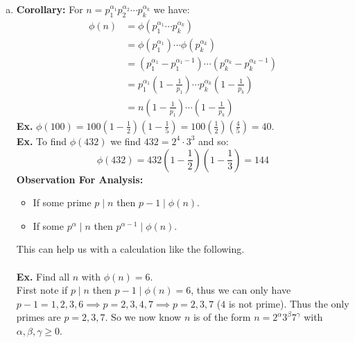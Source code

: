 \documentclass[class=article, crop=false]{standalone}
\begin{document}
\begin{enumerate}
\begin{enumerate}[(a)]
\begin{proof}
		Each is a row $r$ with $\gcd(r,m)=1$. Observe that $\{0,1,2,\cdots,n-1\}$ is a 
		CSOR mod $n$ and since $\gcd(m,n)=1$, so is the set 
		$\{0\cdot m+r, 1\cdot m+r, \cdots, m(n-1)+r\}$. Note this is one of our rows, row $r$.
		Out of that CSOR, $\phi(n)$ will be coprime to $n$ those are also coprime to $m$ because
		they are in a row which survived. Thus they are coprime to $mn$. \\\\
		Finally: $\phi(m)$ rows survive, in each $\phi(n)$ entries. Thus $\phi(m)\phi(n)$ entires coprime to $mn$.
		So $\phi(mn)= \phi(m)\phi(n)$ 
	\end{proof}

	\item \textbf{Corollary:} For $n=p_1^{\alpha_1} p_2^{\alpha_2} \cdots p_k^{\alpha_k}$ we have:
	\begin{align*}
		\phi(n)&= \phi(p_1^{\alpha_1}\cdots p_k^{\alpha_k}) \\
		&= \phi(p_1^{\alpha_1}) \cdots \phi(p_k^{\alpha_k}) \\
		&= (p_1^{\alpha_1} - p_1^{\alpha_1 - 1}) \cdots (p_k^{\alpha_k} - p_k^{\alpha_k -1}) \\
		&= p_1^{\alpha_1}\left(1-\frac{1}{p_1}\right) \cdots p_k^{\alpha_k}\left(1-\frac{1}{p_k}\right) \\
		&= n \left(1-\frac{1}{p_1}\right)\cdots \left(1-\frac{1}{p_k}\right)
	\end{align*}
	\textbf{Ex.} $\phi(100) = 100 (1-\frac{1}{2})(1-\frac{1}{5})= 100(\frac{1}{2})(\frac{4}{5})= 40$. \\
	\textbf{Ex.} To find $\phi(432)$ we find $432 = 2^4 \cdot 3^3$ and so:
	$$\phi(432) = 432\left(1-\frac{1}{2}\right)\left(1-\frac{1}{3}\right) = 144$$
	\textbf{Observation For Analysis:}
	\begin{itemize}
		\item If some prime $p\mid n$ then $p-1\mid \phi(n)$.
		\item If some $p^{\alpha}\mid n$ then $p^{\alpha-1}\mid \phi(n)$. 
	\end{itemize}
	This can help us with a calculation like the following.\\\\
	\textbf{Ex.} Find all $n$ with $\phi(n)=6$. \\
	First note if $p\mid n$ then $p-1\mid \phi(n)=6$, thus we can only have 
	$p-1=1,2,3,6 \implies p = 2,3,4,7 \implies p = 2,3,7$ ($4$ is not prime).
	Thus the only primes are $p=2,3,7$. So we now know $n$ is of the form
	$n=2^{\alpha} 3^{\beta} 7^{\gamma}$ with $\alpha,\beta,\gamma\geq 0$.

\end{enumerate}
\end{enumerate}
\end{document}

